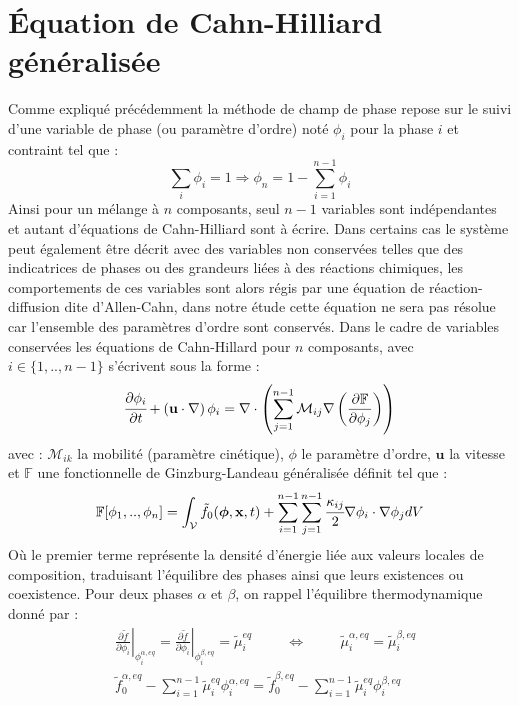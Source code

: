 \section{Équation de Cahn-Hilliard généralisée}
Comme expliqué précédemment la méthode de champ de phase repose sur le suivi d'une variable de phase (ou paramètre d'ordre) noté $\phi_i$ pour la phase $i$ et contraint tel que : 
\begin{equation}
\sum_i \phi_i =1 \Rightarrow \phi_n =1 - \sum_{i=1}^{n-1} \phi_i
\end{equation} 
Ainsi pour un mélange à $n$ composants, seul $n-1$ variables sont indépendantes et autant d'équations de Cahn-Hilliard sont à écrire. Dans certains cas le système peut également être décrit avec des variables non conservées telles que des indicatrices de phases ou des grandeurs liées à des réactions chimiques, les comportements de ces variables sont alors régis par une équation de réaction-diffusion dite d'Allen-Cahn, dans notre étude cette équation ne sera pas résolue car l'ensemble des paramètres d'ordre sont conservés. Dans le cadre de variables conservées les équations de Cahn-Hillard pour $n$ composants, avec $i\in \{1,..,n-1 \}$ s'écrivent sous la forme :
\begin{equation}
\cfrac{\partial \phi_i}{\partial t} + \left(\mathbf{u} \cdot \nabla\right) \phi_i=  \nabla \cdot \left(\sum_{j=1}^{n-1}{\mathcal{M}_{ij}} \nabla\left( \frac{\partial \mathbb{F}}{\partial \phi_j}\right) \right) 
\end{equation}
avec : $\mathcal{M}_{ik}$ la mobilité (paramètre cinétique),  $\phi$ le paramètre d'ordre, $\mathbf{u}$ la vitesse et $\mathbb{F}$ une fonctionnelle de Ginzburg-Landeau généralisée \cite{cardon_modelisation_2016} définit tel que : 
 \begin{equation}
\mathbb{F}[\phi_1,..,\phi_n] = \int_{\mathcal{V}}\tilde{f}_0(\bm{\phi},\mathbf{x},t)+ \sum_{i=1}^{n-1}\sum_{j=1}^{n-1}\cfrac{\kappa_{ij}}{2}\nabla \phi_i \cdot \nabla \phi_j dV
\end{equation}
Où le premier terme représente la densité d'énergie liée aux valeurs locales de composition, traduisant l'équilibre des phases ainsi que leurs existences ou coexistence. Pour deux phases $\alpha$ et $\beta$, on rappel l'équilibre thermodynamique donné par :
\begin{subequations}
	\begin{align}
		&\left.\frac{\partial \tilde{f}}{\partial \phi_i}\right|_{\phi_i^{\alpha,eq}} = \left.\frac{\partial \tilde{f}}{\partial \phi_i}\right|_{\phi_i^{\beta,eq}} = \tilde{\mu}_i^{eq} \hspace{1cm} \Leftrightarrow   \hspace{1cm} \tilde{\mu}_i^{\alpha,eq} = \tilde{\mu}_i^{\beta,eq} \\
		& 		\tilde{f}_0^{\alpha,eq} - \sum_{i=1}^{n-1}\tilde{\mu}_i^{eq}\phi_i^{\alpha,eq} = 	\tilde{f}_0^{\beta,eq} - \sum_{i=1}^{n-1}\tilde{\mu}_i^{eq}\phi_i^{\beta,eq}
	\end{align} 
\end{subequations}
